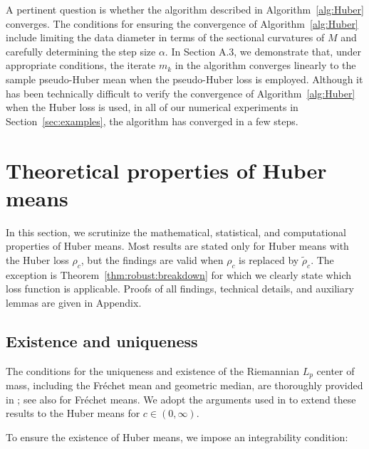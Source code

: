 \documentclass[preprint]{imsart}
\theoremstyle{plain}
\theoremstyle{remark}
\begin{document}
A pertinent question is whether the algorithm described in Algorithm~\ref{alg:Huber} converges. The conditions for ensuring the convergence of Algorithm~\ref{alg:Huber} include limiting the data diameter in terms of the sectional curvatures of $M$ and carefully determining the step size $\alpha$. In Section A.3, we demonstrate that, under appropriate conditions, the iterate $m_k$ in the algorithm converges linearly to the sample pseudo-Huber mean when the pseudo-Huber loss is employed. Although it has been technically difficult to verify the convergence of Algorithm~\ref{alg:Huber} when the Huber loss is used, in all of our numerical experiments in Section~\ref{sec:examples}, the algorithm has converged in a few steps.
  

\section{Theoretical properties of Huber means}\label{sec:thms}
In this section, we scrutinize the mathematical, statistical, and computational properties of Huber means. Most results are stated only for Huber means with the Huber loss $\rho_{c}$, but the findings are valid when $\rho_{c}$ is replaced by $\tilde{\rho}_{c}$. 
The exception is Theorem~\ref{thm:robust:breakdown} for which we clearly state which loss function is applicable. Proofs of all findings, technical details, and auxiliary lemmas are given in Appendix.




\subsection{Existence and uniqueness}\label{sec:exist:unique}


The conditions for the uniqueness and existence of the Riemannian $L_{p}$ center of mass, including the Fr\'{e}chet mean and geometric median, are thoroughly provided in \cite{afsari2011riemannian}; see also \cite{sturm2003probability,huckemann2021data} for Fr\'{e}chet means. We adopt the arguments used in \cite{afsari2011riemannian} to extend these results to the Huber means for $c \in (0,\infty)$. 


To ensure the existence of Huber means, we impose an integrability condition: 
\end{document}
